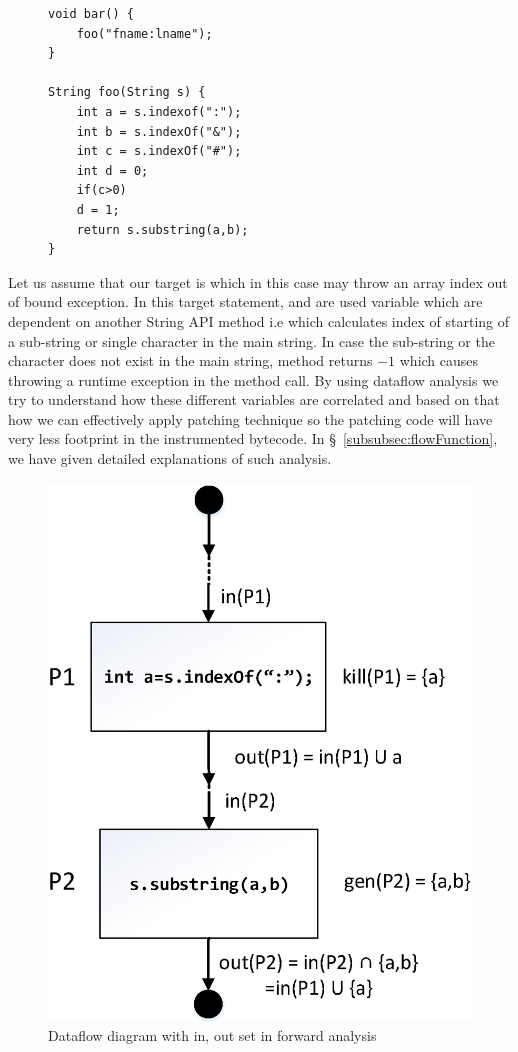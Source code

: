 \lstset{language=Java, caption=Dataflow analysis, label = snippet:dataflow}
\begin{figure}[t]
\begin{lstlisting}
void bar() {
    foo("fname:lname");
}

String foo(String s) {
    int a = s.indexof(":");
    int b = s.indexOf("&");
    int c = s.indexOf("#");
    int d = 0;
    if(c>0)
	d = 1;
    return s.substring(a,b);
}
\end{lstlisting}
\end{figure}

Let us assume that our target is  which in this case
may throw an array index out of bound exception. In this target statement,
 and  are used variable which are dependent on another
String API method i.e  which calculates index of starting of a
sub-string or single character in the main string. In case the sub-string or the
character does not exist in the main string,  method returns
$-1$ which causes throwing a runtime exception in the 
method call.
\newline
By using dataflow analysis we try to understand how these different variables
are correlated and based on that how we can effectively apply patching technique
so the patching code will have very less footprint in the instrumented bytecode.
In \S~\ref{subsubsec:flowFunction}, we have given detailed
explanations of such analysis.

\begin{figure}[t]
\centering
\includegraphics[scale=.30]{images/dataflow.png}
\caption{Dataflow diagram with in, out set in forward analysis}
\label{fig:dataflow}
\end{figure}

